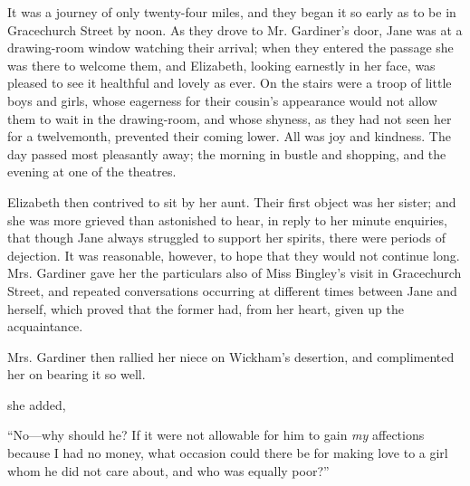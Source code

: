 It was a journey of only twenty-four miles, and they began it so early as to be in Gracechurch Street by noon. As they drove to Mr. Gardiner's door, Jane was at a drawing-room window watching their arrival; when they entered the passage she was there to welcome them, and Elizabeth, looking earnestly in her face, was pleased to see it healthful and lovely as ever. On the stairs were a troop of little boys and girls, whose eagerness for their cousin's appearance would not allow them to wait in the drawing-room, and whose shyness, as they had not seen her for a twelvemonth, prevented their coming lower. All was joy and kindness. The day passed most pleasantly away; the morning in bustle and shopping, and the evening at one of the theatres.

Elizabeth then contrived to sit by her aunt. Their first object was her sister; and she was more grieved than astonished to hear, in reply to her minute enquiries, that though Jane always struggled to support her spirits, there were periods of dejection. It was reasonable, however, to hope that they would not continue long. Mrs. Gardiner gave her the particulars also of Miss Bingley's visit in Gracechurch Street, and repeated conversations occurring at different times between Jane and herself, which proved that the former had, from her heart, given up the acquaintance.

Mrs. Gardiner then rallied her niece on Wickham's desertion, and complimented her on bearing it so well.

 she added, 





“No---why should he? If it were not allowable for him to gain {\em my} affections because I had no money, what occasion could there be for making love to a girl whom he did not care about, and who was equally poor?”


